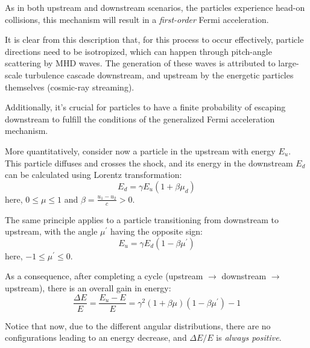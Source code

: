 As in both upstream and downstream scenarios, the particles experience head-on collisions, this mechanism will result in a  \emph{first-order} Fermi acceleration.


It is clear from this description that, for this process to occur effectively, particle directions need to be isotropized, which can happen through pitch-angle scattering by MHD waves. The generation of these waves is attributed to large-scale turbulence cascade downstream, and upstream by the energetic particles themselves (cosmic-ray streaming).

Additionally, it's crucial for particles to have a finite probability of escaping downstream to fulfill the conditions of the generalized Fermi acceleration mechanism.

More quantitatively, consider now a particle in the upstream with energy \( E_u \). This particle diffuses and crosses the shock, and its energy in the downstream \( E_d \) can be calculated using Lorentz transformation:
%
\begin{equation}
E_d = \gamma E_u (1 + \beta \mu_d)
\end{equation}
%
here, \( 0 \le \mu \le 1 \) and \( \beta = \frac{u_1 - u_2}{c} > 0 \).

The same principle applies to a particle transitioning from downstream to upstream, with the angle \( \mu^\prime \) having the opposite sign:
%
\begin{equation}
E_u = \gamma E_d (1 - \beta \mu^\prime)
\end{equation}
here, \( -1 \le \mu^\prime \le 0 \).

As a consequence, after completing a cycle (upstream $\rightarrow$ downstream $\rightarrow$ upstream), there is an overall gain in energy:
%
\begin{equation}
\frac{\Delta E}{E} = \frac{E_u - E}{E} = \gamma^2 (1 + \beta \mu) (1 - \beta \mu^\prime) - 1
\end{equation}

Notice that now, due to the different angular distributions, there are no configurations leading to an energy decrease, and \( \Delta E / E \) is \emph{always positive}.

